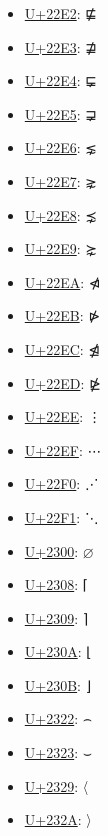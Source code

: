 \begin{itemize}
	\item \href{https://www.compart.com/en/unicode/U+22E2}{U+22E2}: ⋢
	\item \href{https://www.compart.com/en/unicode/U+22E3}{U+22E3}: ⋣
	\item \href{https://www.compart.com/en/unicode/U+22E4}{U+22E4}: ⋤
	\item \href{https://www.compart.com/en/unicode/U+22E5}{U+22E5}: ⋥
	\item \href{https://www.compart.com/en/unicode/U+22E6}{U+22E6}: ⋦
	\item \href{https://www.compart.com/en/unicode/U+22E7}{U+22E7}: ⋧
	\item \href{https://www.compart.com/en/unicode/U+22E8}{U+22E8}: ⋨
	\item \href{https://www.compart.com/en/unicode/U+22E9}{U+22E9}: ⋩
	\item \href{https://www.compart.com/en/unicode/U+22EA}{U+22EA}: ⋪
	\item \href{https://www.compart.com/en/unicode/U+22EB}{U+22EB}: ⋫
	\item \href{https://www.compart.com/en/unicode/U+22EC}{U+22EC}: ⋬
	\item \href{https://www.compart.com/en/unicode/U+22ED}{U+22ED}: ⋭
	\item \href{https://www.compart.com/en/unicode/U+22EE}{U+22EE}: ⋮
	\item \href{https://www.compart.com/en/unicode/U+22EF}{U+22EF}: ⋯
	\item \href{https://www.compart.com/en/unicode/U+22F0}{U+22F0}: ⋰
	\item \href{https://www.compart.com/en/unicode/U+22F1}{U+22F1}: ⋱
	\item \href{https://www.compart.com/en/unicode/U+2300}{U+2300}: ⌀
	\item \href{https://www.compart.com/en/unicode/U+2308}{U+2308}: ⌈
	\item \href{https://www.compart.com/en/unicode/U+2309}{U+2309}: ⌉
	\item \href{https://www.compart.com/en/unicode/U+230A}{U+230A}: ⌊
	\item \href{https://www.compart.com/en/unicode/U+230B}{U+230B}: ⌋
	\item \href{https://www.compart.com/en/unicode/U+2322}{U+2322}: ⌢
	\item \href{https://www.compart.com/en/unicode/U+2323}{U+2323}: ⌣
	\item \href{https://www.compart.com/en/unicode/U+2329}{U+2329}: 〈
	\item \href{https://www.compart.com/en/unicode/U+232A}{U+232A}: 〉

\end{itemize}
